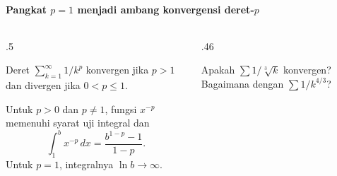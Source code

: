 \documentclass{../../kalkulus-ppt}
\begin{document}
\begin{frame}{\insertsection}
    \framesubtitle{Pangkat $p=1$ menjadi ambang konvergensi deret-$p$}
    \begin{columns}[c,onlytextwidth]
        \begin{column}{.5\textwidth}
            \begin{teorema}
                Deret $\sum_{k=1}^\infty 1/k^p$ konvergen
                jika $p>1$ dan divergen jika $0<p\le1$.
            \end{teorema}
            Untuk $p>0$ dan $p\ne1$, fungsi $x^{-p}$ memenuhi
            syarat uji integral dan
            \[
                \int_1^b x^{-p}\,dx=\frac{b^{1-p}-1}{1-p}.
            \]
            Untuk $p=1$, integralnya $\ln b\to\infty$.
        \end{column}
        \begin{column}{.46\textwidth}
            \begin{contoh}
                Apakah $\sum 1/\sqrt[3]{k}$ konvergen?
                Bagaimana dengan $\sum 1/k^{4/3}$?
            \end{contoh}
        \end{column}
    \end{columns}
\end{frame}
\end{document}
